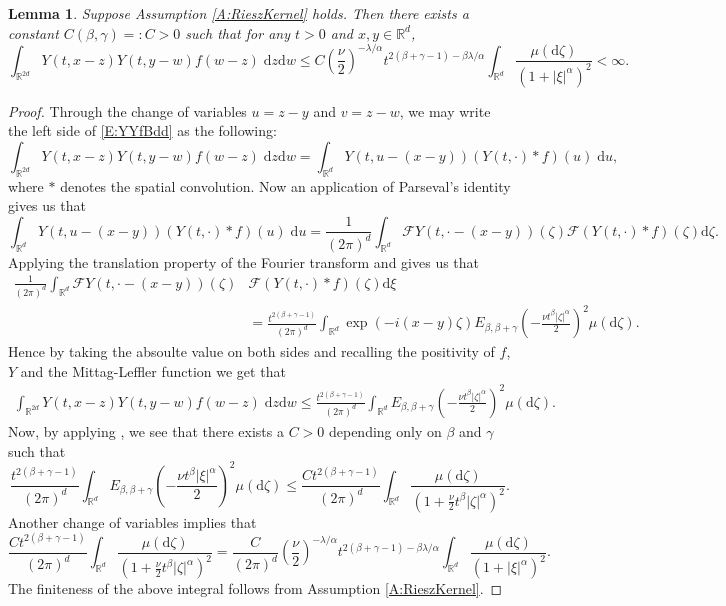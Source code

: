 \documentclass[a4paper,11pt]{article}
\numberwithin{equation}{section}
\theoremstyle{plain}
\newtheorem{lemma}[theorem]{Lemma}
\theoremstyle{definition}
\newcommand{\ud}{\ensuremath{\mathrm{d} }}
\newcommand{\R}{\mathbb{R}}
\numberwithin{NQ}{section}
\numberwithin{LQ}{section}
\numberwithin{ZQ}{section}
\begin{document}
\begin{lemma} \label{L:YfYbdd}
  Suppose Assumption \ref{A:RieszKernel} holds. Then there exists a constant $C(\beta,\gamma) =: C
  >0$ such that for any $t>0$ and $x,y \in \R^d$,
	\begin{equation} \label{E:YYfBdd}
    \int_{\R^{2d}} Y(t,x-z)Y(t,y-w)f(w-z) \; \ud z \ud w \le C \left( \frac{\nu}{2} \right)^{-\lambda / \alpha} t^{2(\beta + \gamma -1)-\beta \lambda / \alpha} \int_{\R^{d}}  \frac{ \mu(\ud \zeta) }{\left(1+ |\xi|^\alpha\right)^2 } < \infty.
	\end{equation}
\end{lemma}
\begin{proof}
  Through the change of variables $u = z-y$ and $v = z-w$, we may write the left side of
  \eqref{E:YYfBdd} as the following:
	\[
	\int_{\R^{2d}} Y(t,x-z)Y(t,y-w)f(w-z) \; \ud z \ud w = \int_{\R^{d}} Y\left(t,u-(x-y)\right)(Y(t,\cdot)*f)(u) \; \ud u,
	\]
  where $*$ denotes the spatial convolution. Now an application of Parseval's identity gives us that
	\[
	\int_{\R^{d}} Y\left(t,u-(x-y)\right)(Y(t,\cdot)*f)(u) \; \ud u = \frac{1}{(2\pi)^d} 	\int_{\R^{d}} \mathcal{F}Y\left(t,\cdot-(x-y)\right)(\zeta) \mathcal{F}(Y(t,\cdot)*f)(\zeta) \ud \zeta.
	\]
  Applying the translation property of the Fourier transform and \cite[Theorem
  4.1]{chen.hu.ea:19:nonlinear} gives us that
	\begin{align*}
    \frac{1}{(2\pi)^d} 	\int_{\R^{d}} \mathcal{F}Y\left(t,\cdot-(x-y)\right)(\zeta)
    & \mathcal{F}(Y(t,\cdot)*f)(\zeta) \ud \xi \\
    & = \frac{ t^{2(\beta + \gamma -1)}}{ (2\pi)^d } \int_{\R^{d}} \exp(-i(x-y)\zeta) E_{\beta,\beta+\gamma}\left(-\frac{\nu t^\beta |\zeta|^\alpha}{2}\right)^2 \mu(\ud \zeta).
	\end{align*}
  Hence by taking the absoulte value on both sides and recalling the positivity of $f$, $Y$ and the
  Mittag-Leffler function we get that
	\begin{align*}
	\int_{\R^{2d}} Y(t,x-z)Y(t,y-w)f(w-z) \; \ud z \ud w \le \frac{ t^{2(\beta + \gamma -1)} }{ (2\pi)^d } \int_{\R^{d}}  E_{\beta,\beta+\gamma}\left(-\frac{\nu t^\beta |\zeta|^\alpha}{2}\right)^2 \mu(\ud \zeta).
	\end{align*}
  Now, by applying \cite[Theorem 1.6]{podlubny:99:fractional}, we see that there exists a $C>0$
  depending only on $\beta$ and $\gamma$ such that
	\[
	\frac{ t^{2(\beta + \gamma -1)}}{ (2\pi)^d } \int_{\R^{d}}  E_{\beta,\beta+\gamma}\left(-\frac{\nu t^\beta |\xi|^\alpha}{2}\right)^2 \mu(\ud \zeta) \le
	\frac{C  t^{2(\beta + \gamma -1)}}{ (2\pi)^d } \int_{\R^{d}}  \frac{ \mu(\ud \zeta) }{\left(1+ \frac{\nu}{2} t^\beta |\zeta|^\alpha \right)^2 } .
	\]
  Another change of variables implies that
	\[
	\frac{C  t^{2(\beta + \gamma -1)}}{ (2\pi)^d } \int_{\R^{d}}  \frac{ \mu(\ud \zeta) }{\left(1+ \frac{\nu}{2} t^\beta |\zeta|^\alpha \right)^2 }  =
	\frac{C }{ (2\pi)^d } \left(\frac{\nu}{2}\right)^{-\lambda/\alpha}  t^{2(\beta + \gamma -1)-\beta \lambda/\alpha} \int_{\R^{d}}  \frac{ \mu(\ud \zeta) }{\left(1+ |\xi|^\alpha\right)^2 } .
	\]
  The finiteness of the above integral follows from Assumption \ref{A:RieszKernel}.
\end{proof}
\end{document}

